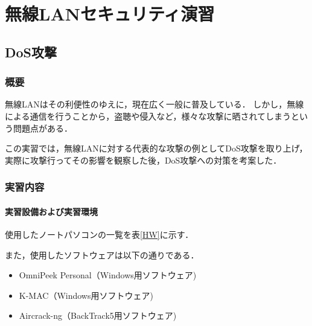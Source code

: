\chapter{無線LANセキュリティ演習}

\section{DoS攻撃}

\subsection{概要}

無線LANはその利便性のゆえに，現在広く一般に普及している．
しかし，無線による通信を行うことから，盗聴や侵入など，様々な攻撃に晒されてしまうという問題点がある．

この実習では，無線LANに対する代表的な攻撃の例としてDoS攻撃を取り上げ，実際に攻撃行ってその影響を観察した後，DoS攻撃への対策を考案した．

\subsection{実習内容}

\subsubsection{実習設備および実習環境}
使用したノートパソコンの一覧を表\ref{HW}に示す．

また，使用したソフトウェアは以下の通りである．

\begin{itemize}
  \item OmniPeek Personal（Windows用ソフトウェア)
  \item K-MAC（Windows用ソフトウェア)
  \item Aircrack-ng（BackTrack5用ソフトウェア)
\end{itemize}

